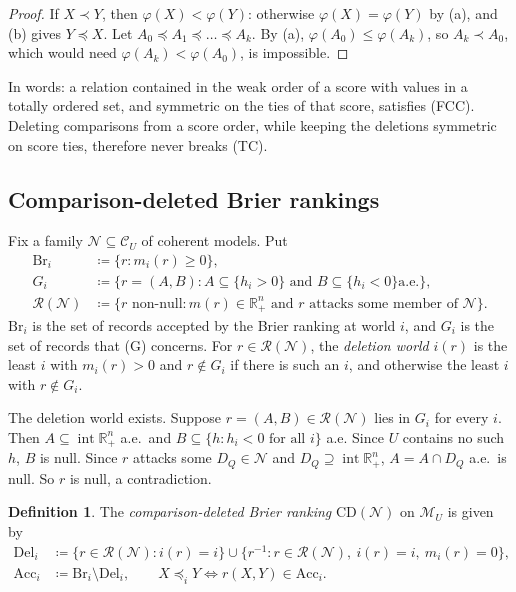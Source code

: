 \documentclass[11pt]{article}
\newcommand{\R}{\mathbb{R}}
\newcommand{\M}{\mathcal{M}}
\newcommand{\CC}{\mathcal{C}}
\newcommand{\NN}{\mathcal{N}}
\newcommand{\RR}{\mathcal{R}}
\newcommand{\CD}{\mathrm{CD}}
\newcommand{\Br}{\mathrm{Br}}
\newcommand{\Acc}{\mathrm{Acc}}
\newcommand{\Del}{\mathrm{Del}}
\newcommand{\Rp}{\R^n_{+}}
\newcommand{\Rpp}{\inter\R^n_{+}}
\DeclareMathOperator{\inter}{int}
\theoremstyle{plain}
\theoremstyle{definition}
\newtheorem{definition}[theorem]{Definition}
\theoremstyle{remark}
\begin{document}
\begin{proof}
If $X\prec Y$, then $\varphi(X)<\varphi(Y)$: otherwise $\varphi(X)=\varphi(Y)$ by (a), and
(b) gives $Y\preceq X$. Let $A_0\preceq A_1\preceq\dots\preceq A_k$. By (a),
$\varphi(A_0)\le\varphi(A_k)$, so $A_k\prec A_0$, which would need $\varphi(A_k)<
\varphi(A_0)$, is impossible.
\end{proof}

In words: a relation contained in the weak order of a score with values in a totally
ordered set, and symmetric on the
ties of that score, satisfies (FCC). Deleting comparisons from a score order, while
keeping the deletions symmetric on score ties, therefore never breaks (TC).

\subsection{Comparison-deleted Brier rankings}

Fix a family $\NN\subseteq\CC_U$ of coherent models. Put
\begin{align*}
  \Br_i&\coloneqq\{r: m_i(r)\ge0\},\\
  G_i&\coloneqq\{r=(A,B): A\subseteq\{h_i>0\}\text{ and }B\subseteq\{h_i<0\}\text{
  a.e.}\},\\
  \RR(\NN)&\coloneqq\{r\text{ non-null}: m(r)\in\Rp\text{ and $r$ attacks some member of
  }\NN\}.
\end{align*}
$\Br_i$ is the set of records accepted by the Brier ranking at world $i$, and $G_i$ is
the set of records that (G) concerns. For $r\in\RR(\NN)$, the \emph{deletion world}
$i(r)$ is the least $i$ with $m_i(r)>0$ and $r\notin G_i$ if there is such an $i$, and
otherwise the least $i$ with $r\notin G_i$.

The deletion world exists. Suppose $r=(A,B)\in\RR(\NN)$ lies in $G_i$ for every $i$. Then
$A\subseteq\Rpp$ a.e.\ and $B\subseteq\{h:h_i<0\text{ for all }i\}$ a.e. Since $U$
contains no such $h$,
$B$ is null. Since $r$ attacks some $D_Q\in\NN$ and $D_Q\supseteq\Rpp$, $A=A\cap D_Q$
a.e.\ is null. So $r$ is null, a contradiction.

\begin{definition}\label{def:CD}
The \emph{comparison-deleted Brier ranking} $\CD(\NN)$ on $\M_U$ is given by
\begin{align*}
  \Del_i&\coloneqq\{r\in\RR(\NN): i(r)=i\}\cup\{r^{-1}: r\in\RR(\NN),\ i(r)=i,\
  m_i(r)=0\},\\
  \Acc_i&\coloneqq\Br_i\setminus\Del_i,\qquad
  X\preceq_iY\iff r(X,Y)\in\Acc_i .
\end{align*}
\end{definition}
\end{document}
